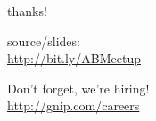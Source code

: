 \documentclass{beamer}
\begin{document}
\begin{frame} \frametitle{}

\vspace{0.5in}

\begin{center}
\Huge{thanks!}

\vspace{0.5in}

\normalsize{source/slides: \\
\url{http://bit.ly/ABMeetup}}

\vspace{0.5in}

\Large{Don't forget, we're hiring!} \\
\url{http://gnip.com/careers}
\end{center}

\end{frame}
\end{document}
